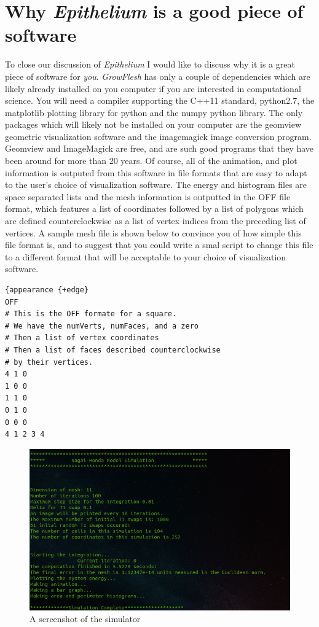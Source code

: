 \section{Why \emph{Epithelium} is a good piece of software}
To close our discussion of \emph{Epithelium} I would like to discuss why it is a great piece of software for \emph{you}. \emph{GrowFlesh} has only a couple of dependencies which are likely already installed on you computer if you are interested in computational science. You will need a compiler supporting the C++11 standard, python2.7,  the matplotlib plotting library for python and the numpy python library. The only packages which will likely not be installed on your computer are the geomview geometric visualization software and the imagemagick image conversion program. Geomview and ImageMagick are free, and are such good programs that they have been around for more than 20 years. Of course, all of the animation, and plot information is outputed from this software in file formats that are easy to adapt to the user's choice of visualization software. The energy and histogram files are space separated lists and the mesh information is outputted in the OFF file format, which features a list of coordinates followed by a list of polygons which are defined counterclockwise as a list of vertex indices from the preceding list of vertices. A  sample mesh file is shown below to convince you of how simple this file format is, and to suggest that you could write a smal script to change this file to a different format that will be acceptable to your choice of visualization software.

\begin{lstlisting}
{appearance {+edge}
OFF 
# This is the OFF formate for a square. 
# We have the numVerts, numFaces, and a zero
# Then a list of vertex coordinates
# Then a list of faces described counterclockwise 
# by their vertices.
4 1 0
1 0 0
1 1 0
0 1 0
0 0 0
4 1 2 3 4
\end{lstlisting}

\begin{figure}[h]
\centering
\includegraphics{../diagrams/screen.png}
\caption{A screenshot of the simulator}
\end{figure}


